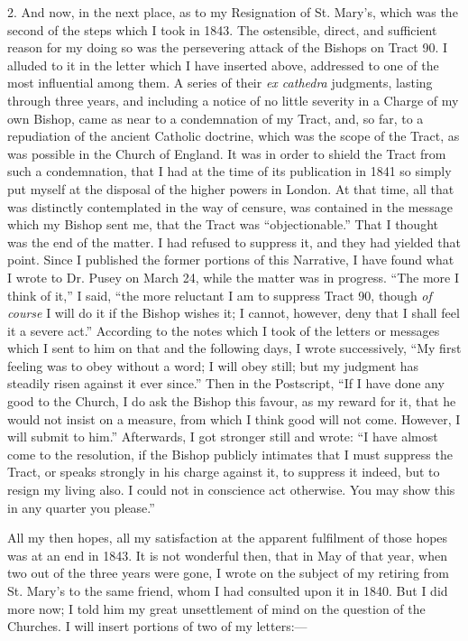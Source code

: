 2. And now, in the next place, as to my Resignation of St. Mary's,
which was the second of the steps which I took in 1843. The ostensible,
direct, and sufficient reason for my doing so was the
persevering attack of the Bishops on Tract 90. I alluded to it in the
letter which I have inserted above, addressed to one of the most
influential among them. A series of their \emph{ex cathedra} judgments,
lasting through three years, and including a notice of no little
severity in a Charge of my own Bishop, came as near to a condemnation of
my Tract, and, so far, to a repudiation of the ancient Catholic
doctrine, which was the scope of the Tract, as was possible in the
Church of England. It was in order to shield the Tract from such a
condemnation, that I had at the time of its publication in 1841
so simply put myself at the disposal of the higher powers in
London. At that time, all that was distinctly contemplated in the way of
censure, was contained in the message which my Bishop sent me,
that the Tract was ``objectionable.'' That I thought was the end of the
matter. I had refused to suppress it, and they had yielded that point.
Since I published the former portions of this Narrative, I have
found what I wrote to Dr. Pusey on March 24, while the matter was in
progress. ``The more I think of it,'' I said, ``the more
reluctant I am to suppress Tract 90, though \emph{of course} I will do
it if the Bishop wishes it; I cannot, however, deny that I shall feel it
a severe act.'' According to the notes which I took of the letters
or messages which I sent to him on that and the following days, I wrote
successively, ``My first feeling was to obey without a word; I will
obey still; but my judgment has steadily risen against it ever
since.'' Then in the Postscript, ``If I have done any good to
the Church, I do ask the Bishop this favour, as my reward for it, that
he would not insist on a measure, from which I think good will not come.
However, I will submit to him.'' Afterwards, I got stronger still and wrote: ``I have almost come to the
resolution, if the Bishop publicly intimates that I must suppress the
Tract, or speaks strongly in his charge against it, to suppress it
indeed, but to resign my living also. I could not in conscience act
otherwise. You may show this in any quarter you please.''

All my then hopes, all my satisfaction at the apparent fulfilment of
those hopes was at an end in 1843. It is not wonderful then,
that in May of that year, when two out of the three years were
gone, I wrote on the subject of my
retiring from St. Mary's to the same friend, whom I had consulted upon it in 1840. But I did more now; I told him
my great unsettlement of mind on the question of the Churches. I will
insert portions of two of my letters:—

